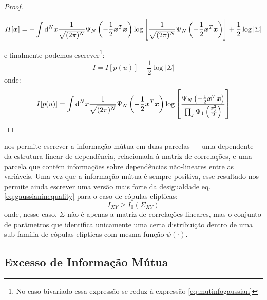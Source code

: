 \begin{proof}
\begin{fullwidth}
\[
H[\bm{x}] = - \int \mathrm{d}^N x \frac{1}{\sqrt{(2\pi)^N}} \Psi_{N}\left(-\frac{1}{2} \bm{x}^{T}\bm{x}\right) \log\left[\frac{1}{\sqrt{(2\pi)^N}} \Psi_{N}\left(-\frac{1}{2} \bm{x}^{T}\bm{x}\right)\right] + \frac{1}{2}\log|\Sigma|
\]
\end{fullwidth}
\newpage
e finalmente podemos escrever\footnote{No caso bivariado essa expressão se reduz à expressão \ref{eq:mutinfogaussian}}:
\begin{equation}
I = I[p(u)] - \frac{1}{2}\log|\Sigma|
\end{equation}
onde:
\begin{equation}
\label{eq:excesselliptical}
I[p(u)] = \int \ud^N x \frac{1}{\sqrt{(2\pi)^N}} \Psi_{N}\left(-\frac{1}{2} \vec{x}^{T}\vec{x}\right) \log\left[\frac{\Psi_{N}\left(-\frac{1}{2} \vec{x}^{T}\vec{x}\right)}{\prod_j \Psi_{1}\left(\frac{x_j^2}{2}\right)}\right]
\end{equation}
\end{proof}

 nos permite escrever a informação mútua em duas parcelas --- uma dependente da estrutura linear de dependência, relacionada à matriz de correlações, e uma parcela que contém informações sobre dependências não-lineares entre as variáveis. Uma vez que a informação mútua é sempre positiva, esse resultado nos permite ainda escrever uma versão mais forte da desigualdade eq.\eqref{eq:gaussianinequality} para o caso de cópulas elípticas:
\begin{equation}
\label{eq:gaussianineqgen}
 I_{XY} \ge I_{0}(\Sigma_{XY})
\end{equation}
onde, nesse caso, $\Sigma$ não é apenas a matriz de correlações lineares, mas o conjunto de parâmetros que identifica unicamente uma certa distribuição dentro de uma sub-família de cópulas elípticas com mesma função $\psi(\cdot)$.

\subsection{Excesso de Informação Mútua}

